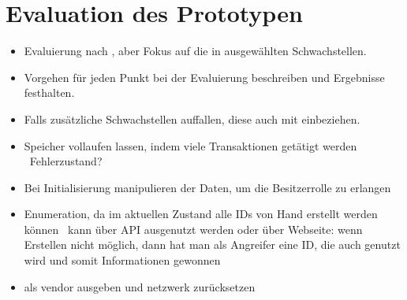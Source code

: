 \section{Evaluation des Prototypen}
\label{sec:evaluation}

    \begin{itemize}[noitemsep]
        \item Evaluierung nach \cite{Miessler}, aber Fokus auf die in  ausgewählten Schwachstellen. 
        \item Vorgehen für jeden Punkt bei der Evaluierung beschreiben und Ergebnisse festhalten. 
        \item Falls zusätzliche Schwachstellen auffallen, diese auch mit einbeziehen.
    \end{itemize}
    
    \begin{itemize}[noitemsep]
        \item Speicher vollaufen lassen, indem viele Transaktionen getätigt werden \textrightarrow\ Fehlerzustand?
        \item Bei Initialisierung manipulieren der Daten, um die Besitzerrolle zu erlangen
        \item Enumeration, da im aktuellen Zustand alle IDs von Hand erstellt werden können \textrightarrow\ kann über API ausgenutzt werden oder über Webseite: wenn Erstellen nicht möglich, dann hat man als Angreifer eine ID, die auch genutzt wird und somit Informationen gewonnen
        \item als vendor ausgeben und netzwerk zurücksetzen
    \end{itemize}